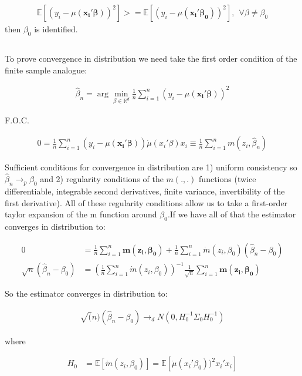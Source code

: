 \documentclass[12pt]{article}
\newcommand{\R}{\mathbb{R}}
\newcommand{\E}{\mathbb{E}}
\newcommand{\qsum}{\sum\limits_{i=1}^n}
\begin{document}
\begin{align*}
  \E[(y_i - \mu(\mathbf{x_i'\beta}))^2] >=  \E[(y_i- \mu(\mathbf{x_i'\beta_0}))^2], \ \ \forall \beta\neq\beta_0
\end{align*}
  \indent then $\beta_0$ is identified.

\subsection{}

To prove convergence in distribution we need take the first order condition of the finite sample analogue:


\begin{align*}
\hat{\beta}_n  = \arg \min_{\beta \in \R^d} \frac{1}{n}\qsum(y_i - \mu(\mathbf{x_i'\beta}))^2
\end{align*}

F.O.C.

\begin{align*}
  0 = \frac{1}{n}\qsum(y_i - \mu(\mathbf{x_i'\beta}))\dot{\mu}(x_i'\beta)x_i \equiv \frac{1}{n}\qsum m(z_i,\hat{\beta}_n)
\end{align*}

Sufficient conditions for convergence in distribution  are 1) uniform consistency so $\hat{\beta}_n \rightarrow_p \beta_0$ and 2) regularity conditions of the $m(.,.)$ functions (twice differentiable, integrable second derivatives, finite variance, invertibility of the first derivative). All of these regularity conditions allow us to take a first-order taylor expansion of the m function around $\beta_0$.If we have all of that the estimator converges in distribution to:

\begin{align*}
  0 &= \frac{1}{n}\qsum \mathbf{m(z_i,\beta_0)} + \frac{1}{n}\qsum \dot{m}(z_i,\beta_0)(\hat{\beta}_n-\beta_0)\\
  \sqrt{n}(\hat{\beta}_n-\beta_0) &= \left(\frac{1}{n}\qsum \dot{m}(z_i,\beta_0) \right)^{-1} \frac{1}{\sqrt{n}}\qsum \mathbf{m(z_i,\beta_0)}
\end{align*}

So the estimator converges in distribution to:

\begin{align*}
  \sqrt(n)(\hat\beta_n - \beta_0) \rightarrow_d N(0,H_0^{-1}\Sigma_0H_0^{-1})
\end{align*}

where

\begin{align*}
  H_0  &= \E[\dot{m}(z_i,\beta_0)] = \E[\dot{\mu}(x_i'\beta_0))^2x_i'x_i]
\end{align*}
\end{document}

